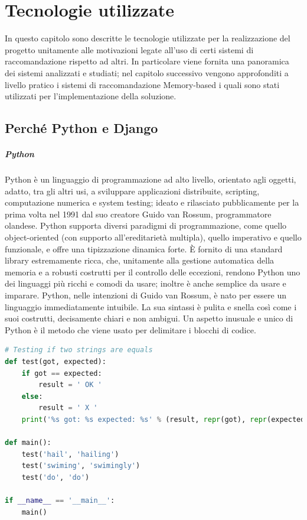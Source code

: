 \chapter{Tecnologie utilizzate}\label{chp:02-technologies}
In questo capitolo sono descritte le tecnologie utilizzate per la realizzazione del progetto unitamente alle motivazioni legate all'uso 
di certi sistemi di raccomandazione rispetto ad altri. In particolare viene fornita una panoramica dei sistemi analizzati e studiati;
nel capitolo successivo vengono approfonditi a livello pratico i sistemi di raccomandazione Memory-based i quali sono stati utilizzati 
per l'implementazione della soluzione.
%
\section{Perché Python e Django}
\paragraph{Python}
Python è un linguaggio di programmazione ad alto livello, orientato agli oggetti, adatto, tra gli altri usi, a sviluppare applicazioni 
distribuite, scripting, computazione numerica e system testing; ideato e rilasciato pubblicamente per la prima volta nel 1991 dal suo 
creatore Guido van Rossum, programmatore olandese.\hfill\break
Python supporta diversi paradigmi di programmazione, come quello object-oriented (con supporto all'ereditarietà multipla), quello 
imperativo e quello funzionale, e offre una tipizzazione dinamica forte. È fornito di una standard library estremamente ricca, che, 
unitamente alla gestione automatica della memoria e a robusti costrutti per il controllo delle eccezioni, rendono Python uno dei linguaggi 
più ricchi e comodi da usare; inoltre è anche semplice da usare e imparare. 
Python, nelle intenzioni di Guido van Rossum, è nato per essere un linguaggio immediatamente intuibile. La sua sintassi è pulita e snella 
così come i suoi costrutti, decisamente chiari e non ambigui.\hfill\break
Un aspetto inusuale e unico di Python è il metodo che viene usato per delimitare i blocchi di codice.
%
\lstset{style=python_code_style}
\begin{lstlisting}[language=Python, caption={Esempio di programma scritto in Python}]
# Testing if two strings are equals
def test(got, expected):
    if got == expected:
        result = ' OK '
    else:
        result = ' X '
    print('%s got: %s expected: %s' % (result, repr(got), repr(expected)))

def main():
    test('hail', 'hailing')
    test('swiming', 'swimingly')
    test('do', 'do')

if __name__ == '__main__':
    main()
\end{lstlisting}

